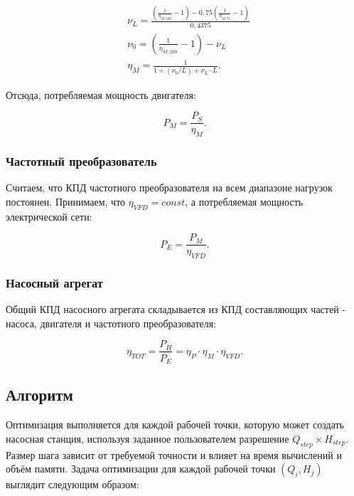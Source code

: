 \documentclass[a4paper, 12pt]{article}
\begin{document}
\begin{equation}
  \begin{aligned}
        &\nu_L = \frac{ \left(\frac{1}{\eta_{M,100}}-1\right) - 0,75 \left(\frac{1}{\eta_{M,75}}-1\right)}{0,4375} \\
        &\nu_0 = \left(\frac{1}{\eta_{M,100}}-1\right)-\nu_L \\
        &\eta_M = \frac{1}{1+ (\nu_0 / L) + \nu_L \cdot L}.
    \end{aligned}
\end{equation}

\noindent Отсюда, потребляемая мощность двигателя:

\begin{equation}
	P_M = \frac{P_S}{\eta_M}.
\end{equation}


\subsubsection{Частотный преобразователь}

    Считаем, что КПД частотного преобразователя на всем диапазоне нагрузок
постоянен. Принимаем, что \(\eta_{VFD} = const\), а потребляемая мощность электрической сети:

\begin{equation}
	P_E = \frac{P_M}{\eta_{VFD}}.
\end{equation}


\subsubsection{Насосный агрегат}

    Общий КПД насосного агрегата складывается из КПД составляющих частей -
насоса, двигателя и частотного преобразователя:

\begin{equation}\label{eq:eff_total}
	\eta_{TOT} = \frac{P_H}{P_E} = \eta_P \cdot \eta_M \cdot \eta_{VFD}.
\end{equation}

\subsection{Алгоритм}

Оптимизация выполняется для каждой рабочей точки, которую может создать насосная станция, используя заданное пользователем разрешение \(Q_{step} \times H_{step}\). Размер шага зависит от требуемой точности и влияет на время вычислений и объём памяти. Задача оптимизации для каждой рабочей точки \((Q_i, H_j)\) выглядит
следующим образом:
\end{document}
